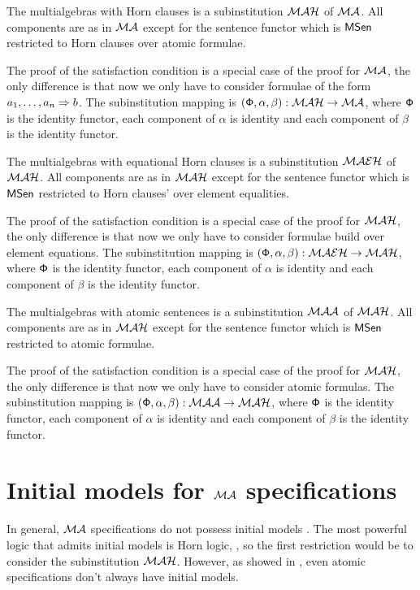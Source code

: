 \documentclass[10pt]{article}
\begin{document}
\begin{fact}\label{fa:mahinst}
The multialgebras with Horn clauses is a subinstitution ${\mathcal{MAH}}$ of
${\mathcal{MA}}$. All components are as in ${\mathcal{MA}}$ except for the sentence
functor  which is ${\sf {MSen}}$ restricted to Horn clauses over
atomic formulae.
\end{fact}
The proof of the satisfaction condition is a special case of the proof for
${\mathcal{MA}}$, the only difference is that now we only have to consider
formulae of the form $a_1, \ldots , a_n \Rightarrow b$.  The subinstitution
mapping is $({\sf {\Phi}},\alpha,\beta): {\mathcal{MAH}} \to {\mathcal{MA}}$, where
${\sf {\Phi}}$ is the identity functor, each component of $\alpha$ is identity
and each component of $\beta$ is the identity functor.


\begin{fact}\label{fa:maeh}
The multialgebras with equational Horn clauses is a subinstitution ${\mathcal{MAEH}}$ of
${\mathcal{MAH}}$. All components are as in ${\mathcal{MAH}}$ except for the sentence
functor  which is ${\sf {MSen}}$ restricted to Horn clauses' over element equalities.
\end{fact}
The proof of the satisfaction condition is a special case of the proof for
${\mathcal{MAH}}$,
the only difference is that now we only have to consider formulae build over element equations.
The subinstitution mapping is $({\sf {\Phi}},\alpha,\beta): {\mathcal{MAEH}} \to
{\mathcal{MAH}}$, where ${\sf {\Phi}}$ is the identity functor, each component of
$\alpha$ is identity and each component of $\beta$ is the
identity functor.

\begin{fact}\label{fa:maa}
The multialgebras with atomic sentences is a subinstitution ${\mathcal{MAA}}$ of
${\mathcal{MAH}}$. All components are as in ${\mathcal{MAH}}$ except for the sentence
functor  which is ${\sf {MSen}}$ restricted to
atomic formulae.
\end{fact}
The proof of the satisfaction condition is a special case of the proof for
${\mathcal{MAH}}$, the only difference is that now we only have to consider atomic
formulas.  The subinstitution mapping is $({\sf {\Phi}},\alpha,\beta):
{\mathcal{MAA}} \to {\mathcal{MAH}}$, where ${\sf {\Phi}}$ is the identity functor, each
component of $\alpha$ is identity and each component of
$\beta$ is the identity functor.


\section{Initial models for ${\mathcal{MA}}$ specifications}
\label{se:init}
In general, ${\mathcal{MA}}$ specifications  do not possess initial models
\cite{hussmann,multi}. The most powerful logic that admits initial models is
Horn logic, \cite{makow}, so the first restriction would be to consider the
subinstitution  ${\mathcal{MAH}}$. However, as showed in
\cite{hussmann}, even atomic specifications don't always have initial models.
\end{document}
